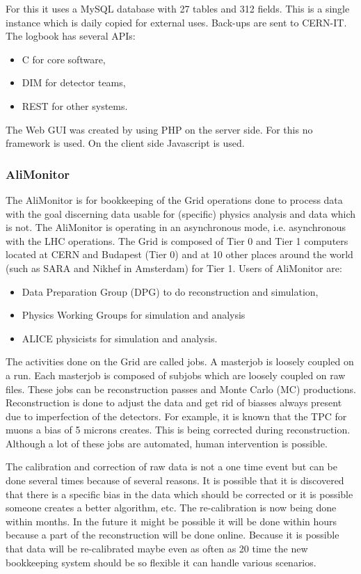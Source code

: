 For this it uses a MySQL database with 27 tables and 312 fields. This is a single instance which is daily copied for external uses. Back-ups are sent to CERN-IT. The logbook has several APIs:
\begin{itemize}
  \item C for core software,
  \item DIM for detector teams,
  \item REST for other systems.
\end{itemize}
The Web GUI was created by using PHP on the server side. For this no framework is used. On the client side Javascript is used.


\subsubsection{AliMonitor}

The AliMonitor is for bookkeeping of the Grid operations done to process data with the goal discerning data usable for (specific) physics analysis and data which is not. The AliMonitor is operating in an asynchronous mode, i.e. asynchronous with the LHC operations. The Grid is composed of Tier 0 and Tier 1 computers located at CERN and Budapest (Tier 0) and at 10 other places around the world (such as SARA and Nikhef in Amsterdam) for Tier 1. Users of AliMonitor are:
\begin{itemize}
  \item Data Preparation Group (DPG) to do reconstruction and simulation,
  \item Physics Working Groups for simulation and analysis
  \item ALICE physicists for simulation and analysis.
\end{itemize}
The activities done on the Grid are called jobs. A masterjob is loosely coupled on a run. Each masterjob is composed of subjobs which are loosely coupled on raw files. These jobs can be reconstruction passes and Monte Carlo (MC) productions. Reconstruction is done to adjust the data and get rid of biasses always present due to imperfection of the detectors. For example, it is known that the TPC for muons a bias of 5 microns creates. This is being corrected during reconstruction. Although a lot of these jobs are automated, human intervention is possible.

The calibration and correction of raw data is not a one time event but can be done several times because of several reasons. It is possible that it is discovered that there is a specific bias in the data which should be corrected or it is possible someone creates a better algorithm, etc. The re-calibration is now being done within months. In the future it might be possible it will be done within hours because a part of the reconstruction will be done online. Because it is possible that data will be re-calibrated maybe even as often as 20 time the new bookkeeping system should be so flexible it can handle various scenarios.

